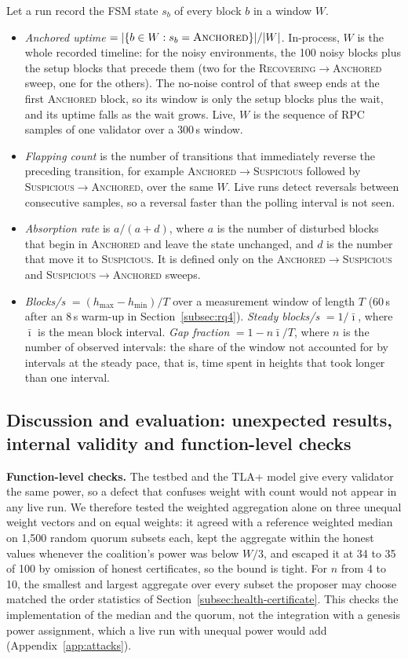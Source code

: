 Let a run record the FSM state $s_b$ of every block $b$ in a window $W$.
\begin{itemize}
  \item \emph{Anchored uptime} $=|\{b\in W : s_b=\textsc{Anchored}\}|/|W|$.
  In-process, $W$ is the whole recorded timeline: for the noisy
  environments, the 100 noisy blocks plus the setup blocks that precede them
  (two for the \textsc{Recovering}$\to$\textsc{Anchored} sweep, one for the
  others). The no-noise control of that sweep ends at the first
  \textsc{Anchored} block, so its window is only the setup blocks plus the
  wait, and its uptime falls as the wait grows. Live, $W$ is the sequence of
  RPC samples of one validator over a 300\,s window.
  \item \emph{Flapping count} is the number of transitions that immediately
  reverse the preceding transition, for example
  \textsc{Anchored}$\to$\textsc{Suspicious} followed by
  \textsc{Suspicious}$\to$\textsc{Anchored}, over the same $W$. Live runs
  detect reversals between consecutive samples, so a reversal faster than
  the polling interval is not seen.
  \item \emph{Absorption rate} is $a/(a+d)$, where $a$ is the number of
  disturbed blocks that begin in \textsc{Anchored} and leave the state
  unchanged, and $d$ is the number that move it to \textsc{Suspicious}.
  It is defined only on the \textsc{Anchored}$\to$\textsc{Suspicious} and
  \textsc{Suspicious}$\to$\textsc{Anchored} sweeps.
  \item \emph{Blocks/s} $=(h_{\max}-h_{\min})/T$ over a measurement window of
  length $T$ (60\,s after an 8\,s warm-up in Section~\ref{subsec:rq4}).
  \emph{Steady blocks/s} $=1/\bar\imath$, where $\bar\imath$ is the mean
  block interval. \emph{Gap fraction} $=1-n\bar\imath/T$, where $n$ is the
  number of observed intervals: the share of the window not accounted for
  by intervals at the steady pace, that is, time spent in heights that took
  longer than one interval.
\end{itemize}


\subsection*{Discussion and evaluation: unexpected results, internal validity and function-level checks}

\textbf{Function-level checks.} The testbed and the TLA+ model give every
validator the same power, so a defect that confuses weight with count would not
appear in any live run. We therefore tested the weighted aggregation alone on three
unequal weight vectors and on equal weights: it agreed with a reference weighted
median on 1{,}500 random quorum subsets each, kept the aggregate within the honest
values whenever the coalition's power was below $W/3$, and escaped it at 34 to 35
of 100 by omission of honest certificates, so the bound is tight. For $n$ from 4
to 10, the smallest and largest aggregate over every subset the proposer may choose
matched the order statistics of Section~\ref{subsec:health-certificate}. This checks
the implementation of the median and the quorum, not the integration with a genesis
power assignment, which a live run with unequal power would add
(Appendix~\ref{app:attacks}).

